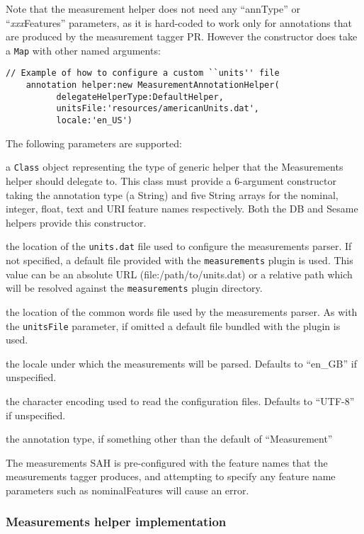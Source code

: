 Note that the measurement helper does not need any ``annType'' or
``{\em xxx}Features'' parameters, as it is hard-coded to work only for
annotations that are produced by the measurement tagger PR.  However the
constructor does take a {\tt Map} with other named arguments:
\begin{lstlisting}[firstnumber=6,texcl]
    // Example of how to configure a custom ``units'' file
    annotation helper:new MeasurementAnnotationHelper(
          delegateHelperType:DefaultHelper,
          unitsFile:'resources/americanUnits.dat',
          locale:'en_US')
\end{lstlisting}

The following parameters are supported:
\bde
\item[delegateHelperType (required)] a {\tt Class} object representing the type
  of generic helper that the Measurements helper should delegate to.  This
  class must provide a 6-argument constructor taking the annotation type (a
  String) and five String arrays for the nominal, integer, float, text and URI
  feature names respectively.  Both the DB and Sesame helpers provide this
  constructor.
\item[unitsFile] the location of the {\tt units.dat} file used to configure the
  measurements parser.  If not specified, a default file provided with the
  {\tt measurements} plugin is used.  This value can be an absolute URL
  (file:/path/to/units.dat) or a relative path which will be resolved against
  the {\tt measurements} plugin directory.
\item[commonWords] the location of the common words file used by the
  measurements parser.  As with the {\tt unitsFile} parameter, if omitted a
  default file bundled with the plugin is used.
\item[locale] the locale under which the measurements will be parsed.  Defaults
  to ``en\_GB'' if unspecified.
\item[encoding] the character encoding used to read the configuration files.
  Defaults to ``UTF-8'' if unspecified.
\item[annType] the annotation type, if something other than the default of
  ``Measurement''
\ede

The measurements SAH is pre-configured with the feature names that the
measurements tagger produces, and attempting to specify any feature name
parameters such as nominalFeatures will cause an error.

\subsubsection{Measurements helper implementation}

